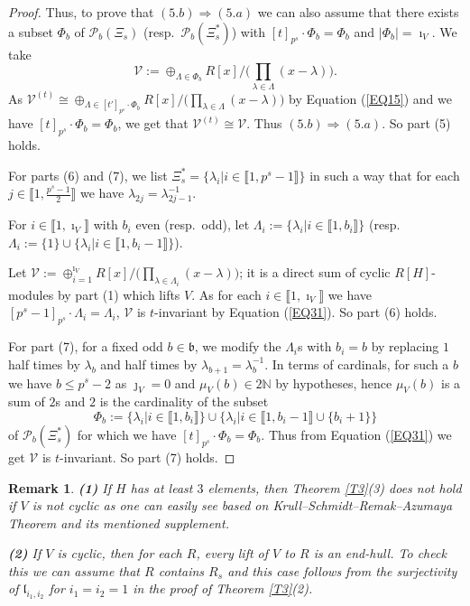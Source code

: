 \documentclass[11pt]{amsart}
\newtheorem{remark}[theorem]{Remark}
\begin{document}
\begin{proof}
Thus, to prove that $(5.b)\Rightarrow (5.a)$ we can also assume that there exists a subset $\Phi_b$ of $\mathcal P_b(\Xi_s)$ (resp.\ $\mathcal P_b(\Xi_s^{\ast})$) with $[t]_{p^s}\cdot\Phi_b=\Phi_b$ and $|\Phi_b|=\imath_V$. We take 
$$\mathcal V:=\oplus_{\Lambda\in\Phi_b} R[x]/\bigl(\prod_{\lambda\in\Lambda} (x-\lambda)\bigr).$$
As $\mathcal V^{(t)}\cong\oplus_{\Lambda\in [t']_{p^s}\cdot\Phi_b} R[x]/\bigl(\prod_{\lambda\in\Lambda} (x-\lambda)\bigr)$ by Equation (\ref{EQ15}) and we have $[t]_{p^s}\cdot\Phi_b=\Phi_b$, we get that $\mathcal V^{(t)}\cong\mathcal V$. Thus $(5.b)\Rightarrow (5.a)$. So part (5) holds.

For parts (6) and (7), we list $\Xi_s^{\ast}=\{\lambda_i|i\in\llbracket1,p^s-1\rrbracket\}$ in such a way that for each $j\in\llbracket1,\frac{p^s-1}{2}\rrbracket$ we have $\lambda_{2j}=\lambda_{2j-1}^{-1}$. 

For $i\in\llbracket1,\imath_V\rrbracket$ with $b_i$ even (resp.\ odd), let $\Lambda_i:=\{\lambda_i|i\in\llbracket1,b_i\rrbracket\}$ (resp.\ $\Lambda_i:=\{1\}\cup\{\lambda_i|i\in\llbracket1,b_i-1\rrbracket\}$). 

Let $\mathcal V:=\oplus_{i=1}^{\imath_V} R[x]/\bigl(\prod_{\lambda\in\Lambda_i} (x-\lambda)\bigr)$; it is a direct sum of cyclic $R[H]$-modules by part (1) which lifts $V$. As for each $i\in\llbracket1,\imath_V\rrbracket$ we have $[p^s-1]_{p^s}\cdot\Lambda_i=\Lambda_i$, $\mathcal V$ is $t$-invariant by Equation (\ref{EQ31}). So part (6) holds.

For part (7), for a fixed odd $b\in\mathfrak b$, we modify the $\Lambda_i$s with $b_i=b$ by replacing $1$ half times by $\lambda_b$ and half times by $\lambda_{b+1}=\lambda_b^{-1}$. In terms of cardinals, for such a $b$ we have $b\le p^s-2$ as $\jmath_V=0$ and $\mu_V(b)\in 2\mathbb N$ by hypotheses, hence $\mu_V(b)$ is a sum of $2$s and $2$ is the cardinality of the subset 
$$\Phi_b:=\{\lambda_i|i\in\llbracket1,b_i\rrbracket\}\cup\{\lambda_i|i\in\llbracket1,b_i-1\rrbracket\cup\{b_i+1\}\}$$ 
of $\mathcal P_b(\Xi_s^{\ast})$ for which we have $[t]_{p^s}\cdot \Phi_b=\Phi_b$. Thus from Equation (\ref{EQ31}) we get $\mathcal V$ is $t$-invariant. So part (7) holds.\end{proof}

\begin{remark}\normalfont\label{R3}
{\bf (1)} If $H$ has at least $3$ elements, then Theorem \ref{T3}(3) does not hold if $V$ is not cyclic as one can easily see based on Krull--Schmidt--Remak--Azumaya Theorem and its mentioned supplement.

\smallskip
{\bf (2)} If $V$ is cyclic, then for each $R$, every lift of $V$ to $R$ is an end-hull. To check this we can assume that $R$ contains $R_s$ and this case follows from the surjectivity of $\mathfrak l_{i_1,i_2}$ for $i_1=i_2=1$ in the proof of Theorem \ref{T3}(2).
\end{remark}
\end{document}
